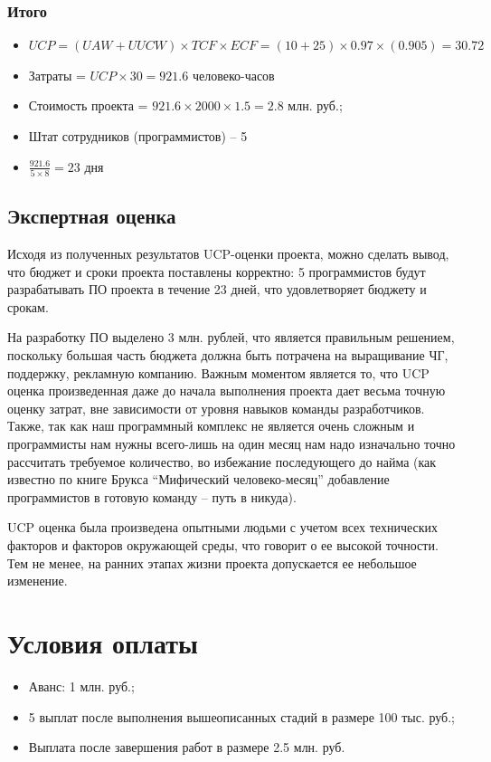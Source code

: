 \documentclass[a4paper,8pt]{article}
\begin{document}
\subsubsection{Итого}


    \begin{itemize}
        \item $UCP = (UAW + UUCW) \times TCF \times ECF = (10 + 25) \times 0.97 \times (0.905) = 30.72$
        \item Затраты = $UCP \times 30 = 921.6$ человеко-часов
        \item Стоимость проекта = $921.6 \times 2000 \times 1.5 = 2.8$ млн. руб.;
        \item Штат сотрудников (программистов) -- 5
        \item $\frac{921.6}{5 \times 8} = 23$ дня
    \end{itemize}

\subsection{Экспертная оценка}

    Исходя из полученных результатов UCP-оценки проекта, можно сделать вывод, что бюджет и сроки проекта поставлены корректно: 5 программистов будут разрабатывать ПО проекта в течение 23 дней, что удовлетворяет бюджету и срокам.

    На разработку ПО выделено 3 млн. рублей, что является правильным решением, поскольку большая часть бюджета должна быть потрачена на выращивание ЧГ, поддержку, рекламную компанию. Важным моментом является то, что UCP оценка произведенная даже до начала выполнения проекта дает весьма точную оценку затрат, вне зависимости от уровня навыков команды разработчиков. Также, так как наш программный комплекс не является очень сложным и программисты нам нужны всего-лишь на один месяц нам надо изначально точно рассчитать требуемое количество, во избежание последующего до найма (как известно по книге Брукса ``Мифический человеко-месяц'' добавление программистов в готовую команду -- путь в никуда). 

    UCP оценка была произведена опытными людьми с учетом всех технических факторов и факторов окружающей среды, что говорит о ее высокой точности. Тем не менее, на ранних этапах жизни проекта допускается ее небольшое изменение.












\section{Условия оплаты}



    \begin{itemize}
        \item Аванс: 1 млн. руб.;
        \item 5 выплат после выполнения вышеописанных стадий в размере 100 тыс. руб.;
        \item Выплата после завершения работ в размере 2.5 млн. руб.
    \end{itemize}
\end{document}
